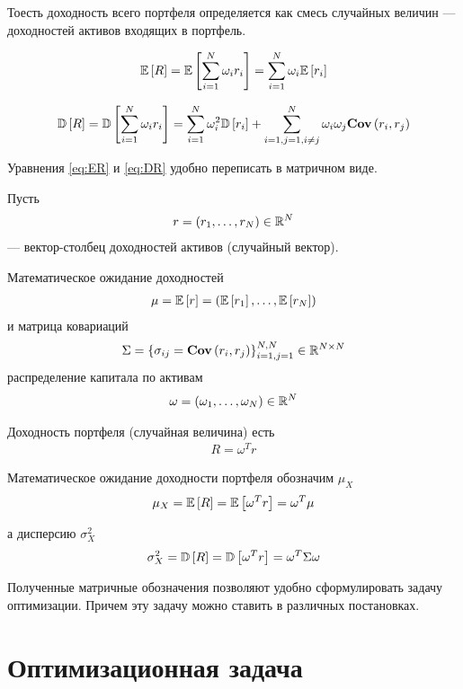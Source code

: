 Тоесть доходность всего портфеля определяется как смесь случайных величин --- доходностей активов
входящих в портфель.

\begin{align} \label{eq:ER}
	\mathbb{E}\left[R\right] = \mathbb{E}\left[\sum_{i=1}^{N} \omega_i r_i\right] 
	= \sum_{i=1}^{N} \omega_i \mathbb{E}\left[r_i\right]
\end{align}

\begin{align} \label{eq:DR}
	\mathbb{D}\left[R\right] = \mathbb{D}\left[\sum_{i=1}^{N} \omega_i r_i\right] 
	= \sum_{i=1}^{N} \omega_i^2 \mathbb{D}\left[r_i\right] 
	+ \sum_{i=1, j=1, i \ne j}^{N} \omega_i \omega_j \textbf{Cov}\left(r_i, r_j\right)
\end{align}

Уравнения \ref{eq:ER} и \ref{eq:DR} удобно переписать в матричном виде. 

Пусть 
\begin{align}
	r = (r_1, \dots, r_N) \in \mathbb{R}^N
\end{align}
--- вектор-столбец доходностей активов (случайный вектор).

Математическое ожидание доходностей
\begin{align}
	\mu = \mathbb{E}\left[r\right] = \left(\mathbb{E}\left[r_1\right], \dots, \mathbb{E}\left[r_N\right]\right)	
\end{align}
и матрица ковариаций
\begin{align}
	\Sigma = \left\{\sigma_{ij} = \textbf{Cov}\left(r_i, r_j\right)\right\}_{i=1, j=1}^{N, N} \in \mathbb{R}^{N \times N}
\end{align}
распределение капитала по активам
\begin{align}
	\omega = \left(\omega_1, \dots, \omega_N \right) \in \mathbb{R}^N
\end{align}

Доходность портфеля (случайная величина) есть
\begin{align}
	R = \omega^T r
\end{align}

Математическое ожидание доходности портфеля обозначим $\mu_X$
\begin{align}
	\mu_X = \mathbb{E}\left[R\right] = \mathbb{E}\left[\omega^T r\right] = \omega^T \mu
\end{align}

а дисперсию $\sigma_X^2$
\begin{align}
	\sigma_X^2 = \mathbb{D}\left[R\right] = \mathbb{D}\left[\omega^T r\right] = \omega^T \Sigma \omega
\end{align}

Полученные матричные обозначения позволяют удобно сформулировать задачу оптимизации.
Причем эту задачу можно ставить в различных постановках.

\section{Оптимизационная задача}

